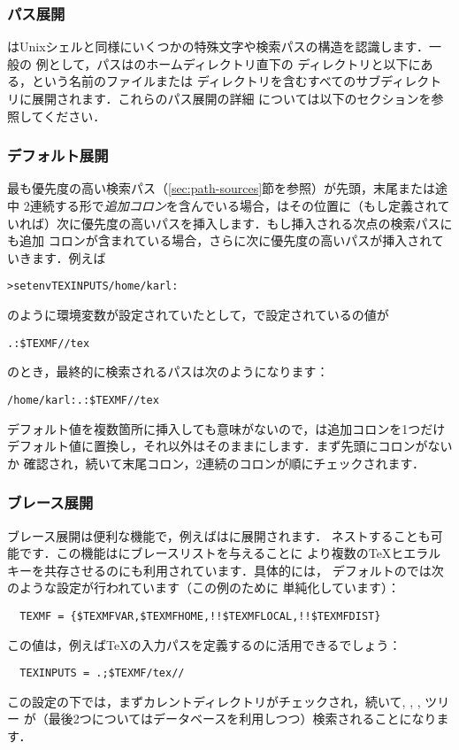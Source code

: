 \documentclass[uplatex,dvipdfmx,tombow]{jsarticle}
\begin{document}
\subsubsection{パス展開}
\label{sec:path-expansion}

\KPS はUnixシェルと同様にいくつかの特殊文字や検索パスの構造を認識します．一般の
例として，パスはのホームディレクトリ直下の
ディレクトリと以下にある，という名前のファイルまたは
ディレクトリを含むすべてのサブディレクトリに展開されます．これらのパス展開の詳細
については以下のセクションを参照してください．

\subsubsection{デフォルト展開}
\label{sec:default-expansion}

最も優先度の高い検索パス（\ref{sec:path-sources}節を参照）が先頭，末尾または途中
2連続する形で\emph{追加コロン}を含んでいる場合，\KPS はその位置に（もし定義されて
いれば）次に優先度の高いパスを挿入します．もし挿入される次点の検索パスにも追加
コロンが含まれている場合，さらに次に優先度の高いパスが挿入されていきます．例えば
%
\begin{alltt}
> setenv TEXINPUTS /home/karl:
\end{alltt}
%
のように環境変数が設定されていたとして，で設定されているの値が
%
\begin{alltt}
  .:\$TEXMF//tex
\end{alltt}
%
のとき，最終的に検索されるパスは次のようになります：
%
\begin{alltt}
  /home/karl:.:\$TEXMF//tex
\end{alltt}
デフォルト値を複数箇所に挿入しても意味がないので，\KPS は追加コロンを1つだけ
デフォルト値に置換し，それ以外はそのままにします．まず先頭にコロンがないか
確認され，続いて末尾コロン，2連続のコロンが順にチェックされます．

\subsubsection{ブレース展開}
\label{sec:brace-expansion}

ブレース展開は便利な機能で，例えばはに展開されます．
ネストすることも可能です．この機能はにブレースリストを与えることに
より複数の\TeX ヒエラルキーを共存させるのにも利用されています．具体的には，
デフォルトのでは次のような設定が行われています（この例のために
単純化しています）：
%
\begin{verbatim}
  TEXMF = {$TEXMFVAR,$TEXMFHOME,!!$TEXMFLOCAL,!!$TEXMFDIST}
\end{verbatim}
%
この値は，例えば\TeX の入力パスを定義するのに活用できるでしょう：
%
\begin{verbatim}
  TEXINPUTS = .;$TEXMF/tex//
\end{verbatim}
%
この設定の下では，まずカレントディレクトリがチェックされ，続いて, , , ツリー
が（最後2つについてはデータベースを利用しつつ）検索されることになります．
\end{document}
